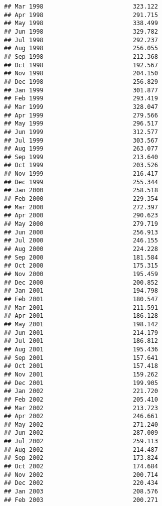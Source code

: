 \documentclass[
]{article}
\begin{document}
\begin{verbatim}
## Mar 1998                         323.122
## Apr 1998                         291.715
## May 1998                         338.499
## Jun 1998                         329.782
## Jul 1998                         292.237
## Aug 1998                         256.055
## Sep 1998                         212.368
## Oct 1998                         192.567
## Nov 1998                         204.150
## Dec 1998                         256.829
## Jan 1999                         301.877
## Feb 1999                         293.419
## Mar 1999                         328.047
## Apr 1999                         279.566
## May 1999                         296.517
## Jun 1999                         312.577
## Jul 1999                         303.567
## Aug 1999                         263.077
## Sep 1999                         213.640
## Oct 1999                         203.526
## Nov 1999                         216.417
## Dec 1999                         255.344
## Jan 2000                         258.518
## Feb 2000                         229.354
## Mar 2000                         272.397
## Apr 2000                         290.623
## May 2000                         279.719
## Jun 2000                         256.913
## Jul 2000                         246.155
## Aug 2000                         224.228
## Sep 2000                         181.584
## Oct 2000                         175.315
## Nov 2000                         195.459
## Dec 2000                         200.852
## Jan 2001                         194.798
## Feb 2001                         180.547
## Mar 2001                         211.591
## Apr 2001                         186.128
## May 2001                         198.142
## Jun 2001                         214.179
## Jul 2001                         186.812
## Aug 2001                         195.436
## Sep 2001                         157.641
## Oct 2001                         157.418
## Nov 2001                         159.262
## Dec 2001                         199.905
## Jan 2002                         221.720
## Feb 2002                         205.410
## Mar 2002                         213.723
## Apr 2002                         246.661
## May 2002                         271.240
## Jun 2002                         287.009
## Jul 2002                         259.113
## Aug 2002                         214.487
## Sep 2002                         173.824
## Oct 2002                         174.684
## Nov 2002                         200.714
## Dec 2002                         220.434
## Jan 2003                         208.576
## Feb 2003                         200.271

\end{verbatim}
\end{document}
